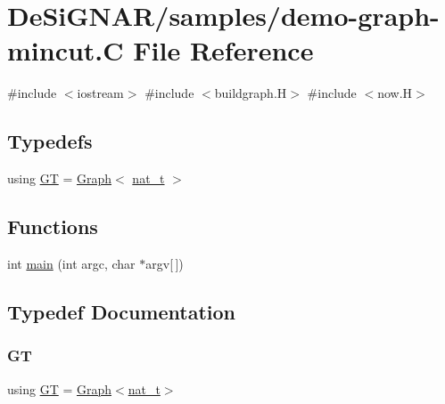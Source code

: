 \hypertarget{demo-graph-mincut_8_c}{}\section{De\+Si\+G\+N\+A\+R/samples/demo-\/graph-\/mincut.C File Reference}
\label{demo-graph-mincut_8_c}
{\ttfamily \#include $<$iostream$>$}\newline
{\ttfamily \#include $<$buildgraph.\+H$>$}\newline
{\ttfamily \#include $<$now.\+H$>$}\newline
\subsection*{Typedefs}
\begin{DoxyCompactItemize}
\item 
using \hyperlink{demo-graph-mincut_8_c_a3001c40d2c31ca87ed96cd7d1334a55e}{GT} = \hyperlink{class_designar_1_1_graph}{Graph}$<$ \hyperlink{namespace_designar_aa72662848b9f4815e7bf31a7cf3e33d1}{nat\+\_\+t} $>$
\end{DoxyCompactItemize}
\subsection*{Functions}
\begin{DoxyCompactItemize}
\item 
int \hyperlink{demo-graph-mincut_8_c_a0ddf1224851353fc92bfbff6f499fa97}{main} (int argc, char $\ast$argv\mbox{[}$\,$\mbox{]})
\end{DoxyCompactItemize}


\subsection{Typedef Documentation}
\mbox{\label{demo-graph-mincut_8_c_a3001c40d2c31ca87ed96cd7d1334a55e}} 
\subsubsection{\texorpdfstring{GT}{GT}}
{\footnotesize\ttfamily using \hyperlink{demo-buildgraph_8_c_a3001c40d2c31ca87ed96cd7d1334a55e}{GT} =  \hyperlink{class_designar_1_1_graph}{Graph}$<$\hyperlink{namespace_designar_aa72662848b9f4815e7bf31a7cf3e33d1}{nat\+\_\+t}$>$}




